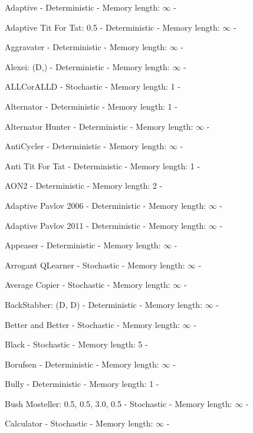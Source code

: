 \item Adaptive - Deterministic - Memory length: \(\infty\) - \cite{Li2011}
\item Adaptive Tit For Tat: 0.5 - Deterministic - Memory length: \(\infty\) - \cite{Tzafestas2000}
\item Aggravater - Deterministic - Memory length: \(\infty\) - \cite{Knight2018}
\item Alexei: (D,) - Deterministic - Memory length: \(\infty\) - \cite{LessWrong2011}
\item ALLCorALLD - Stochastic - Memory length: 1 - \cite{Akin2015}
\item Alternator - Deterministic - Memory length: 1 - \cite{Mittal2009, Axelrod1984}
\item Alternator Hunter - Deterministic - Memory length: \(\infty\) - \cite{Knight2018}
\item AntiCycler - Deterministic - Memory length: \(\infty\) - \cite{Knight2018}
\item Anti Tit For Tat - Deterministic - Memory length: 1 - \cite{Hilbe2013}
\item AON2 - Deterministic - Memory length: 2 - \cite{Hilbe2017}
\item Adaptive Pavlov 2006 - Deterministic - Memory length: \(\infty\) - \cite{Li2007}
\item Adaptive Pavlov 2011 - Deterministic - Memory length: \(\infty\) - \cite{Li2011}
\item Appeaser - Deterministic - Memory length: \(\infty\) - \cite{Knight2018}
\item Arrogant QLearner - Stochastic - Memory length: \(\infty\) - \cite{Knight2018}
\item Average Copier - Stochastic - Memory length: \(\infty\) - \cite{Knight2018}
\item BackStabber: (D, D) - Deterministic - Memory length: \(\infty\) - \cite{Knight2018}
\item Better and Better - Stochastic - Memory length: \(\infty\) - \cite{Prison1998}
\item Black - Stochastic - Memory length: 5 - \cite{Axelrod1980b}
\item Borufsen - Deterministic - Memory length: \(\infty\) - \cite{Axelrod1980b}
\item Bully - Deterministic - Memory length: 1 - \cite{Nachbar1992}
\item Bush Mosteller: 0.5, 0.5, 3.0, 0.5 - Stochastic - Memory length: \(\infty\) - \cite{Luis2008}
\item Calculator - Stochastic - Memory length: \(\infty\) - \cite{Prison1998}
